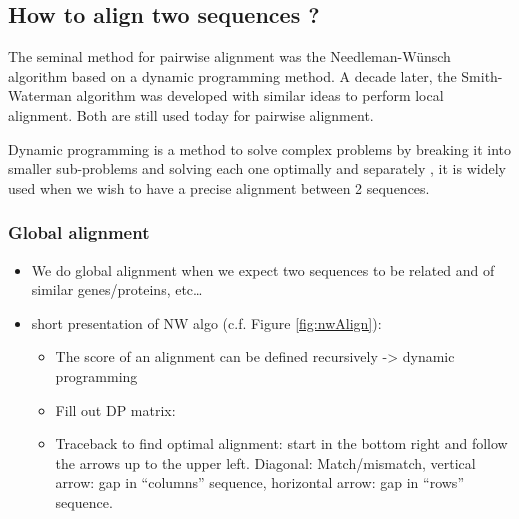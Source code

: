 \documentclass[
  11pt,
  twoside]{scrbook}
\providecommand{\tightlist}{%
  \setlength{\itemsep}{0pt}\setlength{\parskip}{0pt}}
\begin{document}
\hypertarget{how-to-align-two-sequences}{%
\subsection{How to align two sequences ?}\label{how-to-align-two-sequences}}

The seminal method for pairwise alignment was the Needleman-Wünsch algorithm \autocite{needlemanGeneralMethodApplicable1970} based on a dynamic programming method. A decade later, the Smith-Waterman algorithm \autocite{smithIdentificationCommonMolecular1981} was developed with similar ideas to perform local alignment. Both are still used today for pairwise alignment.

Dynamic programming is a method to solve complex problems by breaking it into smaller sub-problems and solving each one optimally and separately \autocite{bradleyAppliedMathematicalProgramming1977,bellmanTheoryDynamicProgramming1954}, it is widely used when we wish to have a precise alignment between 2 sequences.

\hypertarget{global-alignment}{%
\subsubsection{Global alignment}\label{global-alignment}}

\begin{itemize}
\tightlist
\item
  We do global alignment when we expect two sequences to be related and of similar genes/proteins, etc\ldots{}
\item
  short presentation of NW algo (c.f. Figure \ref{fig:nwAlign}):

  \begin{itemize}
  \item
    The score of an alignment can be defined recursively -\textgreater{} dynamic programming
  \item
    Fill out DP matrix:
  \item
    Traceback to find optimal alignment: start in the bottom right and follow the arrows up to the upper left. Diagonal: Match/mismatch, vertical arrow: gap in ``columns'' sequence, horizontal arrow: gap in ``rows'' sequence.
  \end{itemize}
\end{itemize}
\end{document}

